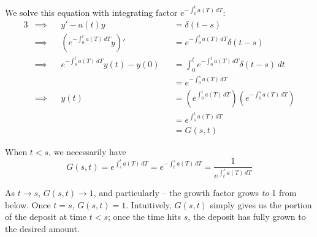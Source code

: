 \documentclass[a4paper]{article}
\begin{document}
We solve this equation with integrating factor \(e^{-\int^{t}_{0} a \!\left( T \right)  \, dT }\):
\begin{alignat*}{3}
	&\implies && y' - a \!\left( t \right) y && = \delta \!\left( t - s \right)  \\
	&\implies && \!\left( e^{-\int^{t}_{0} a \!\left( T \right)  \, dT } y \right)' && = e^{-\int^{t}_{0} a \!\left( T \right)  \, dT } \delta \!\left( t - s \right)  \\
	&\implies && e^{-\int^{t}_{0} a \!\left( T \right)  \, dT } y \!\left( t \right) - y \!\left( 0 \right) && = \int^{t}_{0} e^{-\int^{t}_{0} a \!\left( T \right)  \, dT } \delta \!\left( t - s \right)  \, dt \\
	& && && = e^{-\int^{s}_{0} a \!\left( T \right)  \, dT } \\
	&\implies && y \!\left( t \right) && = \!\left( e^{\int^{t}_{0} a \!\left( T \right)  \, dT } \right) \!\left( e^{-\int^{s}_{0} a \!\left( T \right)  \, dT } \right) \\
	& && && = e^{\int^{t}_{s} a \!\left( T \right)  \, dT } \\
	& && && = G \!\left( s,t \right) 
\end{alignat*}


When \(t < s\), we necessarily have
\[
	G \!\left( s,t \right) = e^{\int^{t}_{s} a \!\left( T \right)   \, dT } = e^{-\int^{s}_{t} a \!\left( T \right)  \, dT } = \frac{1}{e^{\int^{s}_{t} a \!\left( T \right)  \, dT }}
\]

As \(t \rightarrow s\), \(G \!\left( s, t \right) \rightarrow 1\), and particularly -- the growth factor grows \textit{to} 1 from below. Once \(t = s \), \(G \!\left( s, t \right) = 1\). Intuitively, \(G \!\left( s,t \right) \) simply gives us the portion of the deposit at time \(t < s\); once the time hits \(s\), the deposit has fully grown to the desired amount. 
\end{document}

